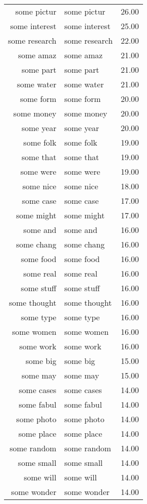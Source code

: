 \begin{table}[ht]
\begin{tabular}{rlr}
  some pictur & some pictur & 26.00 \\ 
  some interest & some interest & 25.00 \\ 
  some research & some research & 22.00 \\ 
  some amaz & some amaz & 21.00 \\ 
  some part & some part & 21.00 \\ 
  some water & some water & 21.00 \\ 
  some form & some form & 20.00 \\ 
  some money & some money & 20.00 \\ 
  some year & some year & 20.00 \\ 
  some folk & some folk & 19.00 \\ 
  some that & some that & 19.00 \\ 
  some were & some were & 19.00 \\ 
  some nice & some nice & 18.00 \\ 
  some case & some case & 17.00 \\ 
  some might & some might & 17.00 \\ 
  some and & some and & 16.00 \\ 
  some chang & some chang & 16.00 \\ 
  some food & some food & 16.00 \\ 
  some real & some real & 16.00 \\ 
  some stuff & some stuff & 16.00 \\ 
  some thought & some thought & 16.00 \\ 
  some type & some type & 16.00 \\ 
  some women & some women & 16.00 \\ 
  some work & some work & 16.00 \\ 
  some big & some big & 15.00 \\ 
  some may & some may & 15.00 \\ 
  some cases & some cases & 14.00 \\ 
  some fabul & some fabul & 14.00 \\ 
  some photo & some photo & 14.00 \\ 
  some place & some place & 14.00 \\ 
  some random & some random & 14.00 \\ 
  some small & some small & 14.00 \\ 
  some will & some will & 14.00 \\ 
  some wonder & some wonder & 14.00 \\ 

\end{tabular}
\end{table}
